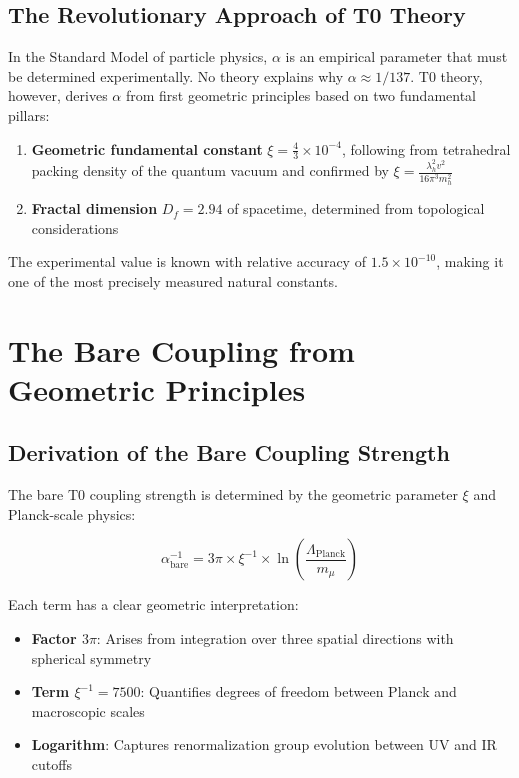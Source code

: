 \documentclass[12pt,a4paper]{article}
\theoremstyle{definition}
\begin{document}
	\subsection{The Revolutionary Approach of T0 Theory}
	
	In the Standard Model of particle physics, $\alpha$ is an empirical parameter that must be determined experimentally. No theory explains why $\alpha \approx 1/137$. T0 theory, however, derives $\alpha$ from first geometric principles based on two fundamental pillars:
	
	\begin{enumerate}
		\item \textbf{Geometric fundamental constant} $\xi = \frac{4}{3} \times 10^{-4}$, following from tetrahedral packing density of the quantum vacuum and confirmed by $\xi = \frac{\lambda_h^2 v^2}{16\pi^3 m_h^2}$
		\item \textbf{Fractal dimension} $D_f = 2.94$ of spacetime, determined from topological considerations
	\end{enumerate}
	
	The experimental value is known with relative accuracy of $1.5 \times 10^{-10}$, making it one of the most precisely measured natural constants.
	
	\section{The Bare Coupling from Geometric Principles}
	
	\subsection{Derivation of the Bare Coupling Strength}
	
	The bare T0 coupling strength is determined by the geometric parameter $\xi$ and Planck-scale physics:
	
	\begin{equation}
		\alpha_{\text{bare}}^{-1} = 3\pi \times \xi^{-1} \times \ln\left(\frac{\Lambda_{\text{Planck}}}{m_{\mu}}\right)
	\end{equation}
	
	Each term has a clear geometric interpretation:
	
	\begin{itemize}
		\item \textbf{Factor $3\pi$}: Arises from integration over three spatial directions with spherical symmetry
		\item \textbf{Term $\xi^{-1} = 7500$}: Quantifies degrees of freedom between Planck and macroscopic scales
		\item \textbf{Logarithm}: Captures renormalization group evolution between UV and IR cutoffs
	\end{itemize}
	
\end{document}

